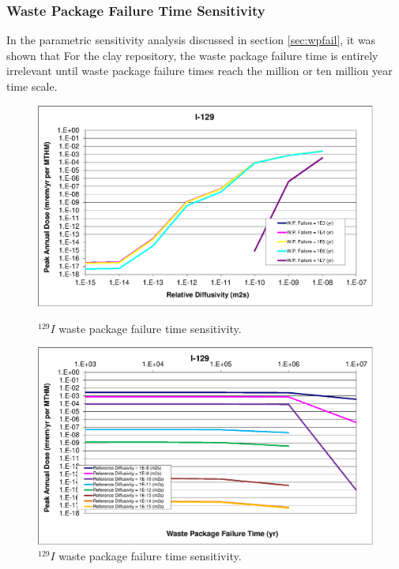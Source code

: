 \subsubsection{Waste Package Failure Time Sensitivity}

In the parametric sensitivity analysis discussed in section 
\ref{sec:wpfail}, it was shown that For the clay repository, the waste 
package failure time is entirely irrelevant until waste package failure times 
reach the million or ten million year time scale. 

\begin{figure}[ht!]
  \centering
  \begin{minipage}[b]{0.45\linewidth}
    \includegraphics[width=\linewidth]{./chapters/nuclide_sensitivity/clay/WPFailExtended/I-129.eps}
    \caption{$^{129}I$ waste package failure time sensitivity. }
    \label{fig:WPFailI129}

  \end{minipage}
  \hspace{0.05\linewidth}
  \begin{minipage}[b]{0.45\linewidth}

    \includegraphics[width=\linewidth]{./chapters/nuclide_sensitivity/clay/WPFailExtended/I-129-WPFail.eps}
    \caption{$^{129}I$ waste package failure time sensitivity. }
    \label{fig:WPFailI129}

  \end{minipage}
\end{figure}
